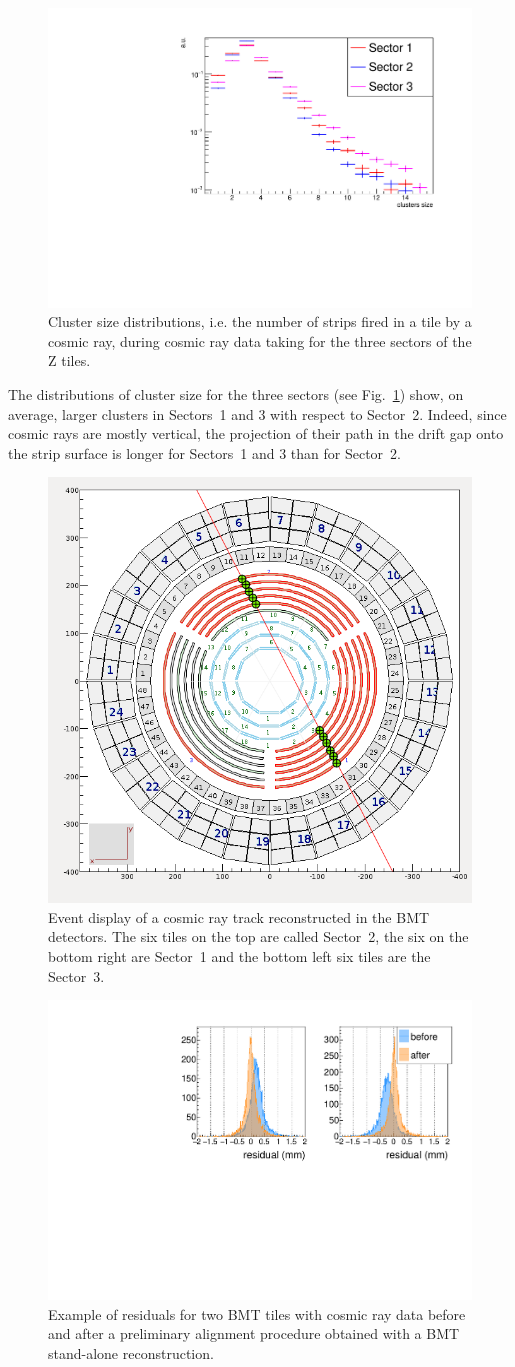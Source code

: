 \begin{figure}[htb]
 \includegraphics[width=.45\textwidth]{images/cosmic_cluster_size.pdf}
 \caption{Cluster size distributions, i.e. the number of strips fired in a tile by a cosmic ray, during cosmic ray data
   taking for the three sectors of the Z tiles.}
 \label{fig:mm-cosmic_cls}
\end{figure}

The distributions of cluster size for the three sectors (see Fig.~\ref{fig:mm-cosmic_cls}) show, on average, larger
clusters in Sectors~1 and 3 with respect to Sector~2. Indeed, since cosmic rays are mostly vertical, the projection of
their path in the drift gap onto the strip surface is longer for Sectors~1 and 3 than for Sector~2.

\begin{figure}[htb]
\centering
 \includegraphics[width=.4\textwidth]{images/cosmic_NIM.png}
 \caption{Event display of a cosmic ray track reconstructed in the BMT detectors. The six tiles on the top are called
   Sector~2, the six on the bottom right are Sector~1 and the bottom left six tiles are the Sector~3.}
 \label{fig:mm-cosmic_ced}
\end{figure}

\begin{figure}[htb]
 \includegraphics[width=.45\textwidth]{images/cosmic_residuals.pdf}
 \caption{Example of residuals for two BMT tiles with cosmic ray data before and after a preliminary alignment procedure
   obtained with a BMT stand-alone reconstruction.}
 \label{fig:mm-cosmic_residuals}
\end{figure}

